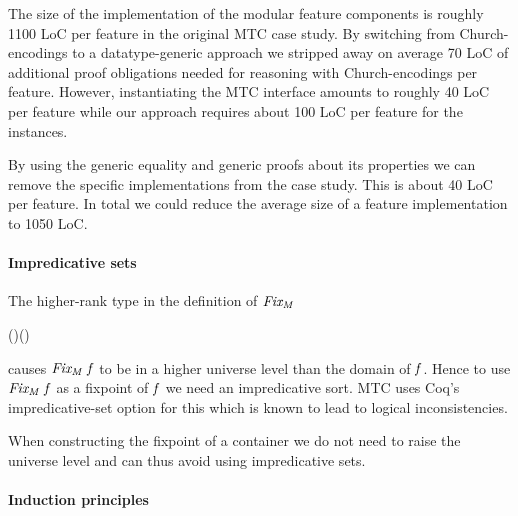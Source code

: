 The size of the implementation of the modular feature components is
roughly 1100 LoC per feature in the original MTC case study. By
switching from Church-encodings to a datatype-generic approach we
stripped away on average 70 LoC of additional proof obligations needed
for reasoning with Church-encodings per feature. However, instantiating
the MTC interface amounts to roughly 40 LoC per feature while our approach
requires about 100 LoC per feature for the instances.

By using the generic equality and generic proofs about its properties
we can remove the specific implementations from the case study. This
is about 40 LoC per feature. In total we could reduce the average size
of a feature implementation to 1050 LoC.

\paragraph{Impredicative sets}\label{ssec:impredicativeset}

The higher-rank type in the definition of \ensuremath{\Varid{Fix_{M}}}
\begin{hscode}\SaveRestoreHook
{}%
%
%
\>[3]{}\;(\mathbin{::}\to {})\mathrel{=}\forall (\mathbin{::})\hsforall {}\;\;\to {}\<[E]%
\ColumnHook
\end{hscode}\resethooks
causes \ensuremath{\Varid{Fix_{M}}\;\Varid{f}} to be in a higher universe level than the domain of
\ensuremath{\Varid{f}}. Hence to use \ensuremath{\Varid{Fix_{M}}\;\Varid{f}} as a fixpoint of \ensuremath{\Varid{f}} we need an
impredicative sort. MTC uses Coq's impredicative-set option for this
which is known to lead to logical inconsistencies.

When constructing the fixpoint of a container we do not need to raise
the universe level and can thus avoid using impredicative sets.

\paragraph{Induction principles}


